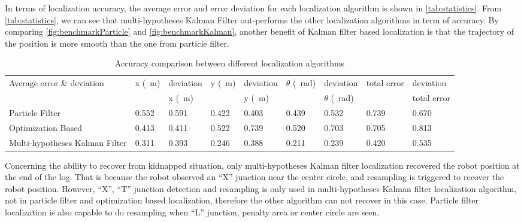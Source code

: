In terms of localization accuracy, the average error and error deviation for each localization algorithm is shown in \autoref{tab:statistics}. From \autoref{tab:statistics}, we can see that multi-hypotheses Kalman Filter out-performs the other localization algorithms in term of accuracy. By comparing \autoref{fig:benchmarkParticle} and \autoref{fig:benchmarkKalman}, another benefit of  Kalman filter based localization is that the trajectory of the position is more smooth than the one from particle filter.
\begin{table}[h!]
  \centering
  \caption{Accuracy comparison between different localization algorithms}
  \label{tab:statistics}
  \begin{adjustbox}{max width=\textwidth}
    \begin{tabular}{l|l|l|l|l|l|l|l|l}
      Average error  \& deviation & x (\SI{}{\meter})                   &  deviation     & y  (\SI{}{\meter})                   & deviation        & $\theta$  (\SI{}{\radian})            &deviation    & total error         &deviation           \\
      &                     & x (\SI{}{\meter})&                     &  y (\SI{}{\meter})&                     &  $\theta$ (\SI{}{\radian}) &                     & total error\\ \hline
      Particle Filter                & 0.552& 0.591 & 0.422 & 0.403 & 0.439 & 0.532 & 0.739 & 0.670   \\ \hline
      Optimization Based            & 0.413 & 0.411 & 0.522 & 0.739 & 0.520 & 0.703 & 0.705 & 0.813   \\ \hline
      Multi-hypotheses Kalman Filter & 0.311 & 0.393 & 0.246 & 0.388 & 0.211 & 0.239 & 0.420 & 0.535  
    \end{tabular}
  \end{adjustbox}
\end{table}

Concerning the ability to recover from kidnapped situation, only multi-hypotheses Kalman filter localization recovered the robot position at the end of the log. That is because the robot observed an ``X'' junction near the center circle, and resampling is triggered to recover the robot position. However, ``X'', ``T'' junction detection and resampling is only used in multi-hypotheses Kalman filter localization algorithm, not in particle filter and optimization based localization, therefore the other algorithm can not recover in this case. Particle filter localization is also capable to do resampling when ``L'' junction, penalty area or center circle are seen.

